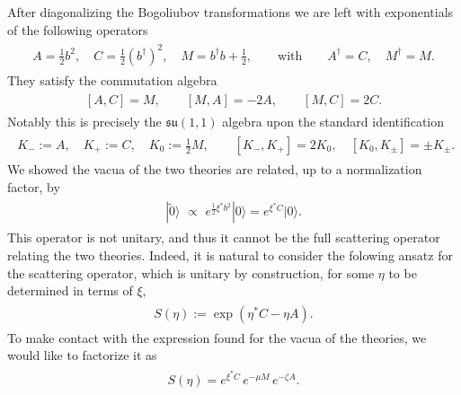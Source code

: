 \documentclass[../QFT_main.tex]{subfiles}
\begin{document}
\begin{mytheorem}
%
After diagonalizing the Bogoliubov transformations we are left with exponentials of the following operators
\begin{align}
\begin{aligned}
    A=\frac12 b^2,\quad C=\frac12 (b^\dagger)^2,\quad M=b^\dagger b+\frac12, \qquad \text{with}\qquad A^\dagger=C,\quad M^\dagger=M.
\end{aligned}\end{align}
They satisfy the commutation algebra
\begin{align}
\begin{aligned}
    [A,C]=M,\qquad [M,A]=-2A,\qquad [M,C]=2C.
\end{aligned}\end{align}
Notably this is precisely the $\mathfrak{su}(1,1)$ algebra upon the standard identification
\begin{align}
\begin{aligned}
    K_-:=A,\quad K_+:=C,\quad K_0:=\frac12 M,
    \qquad [K_-,K_+]=2K_0,\quad [K_0,K_\pm]=\pm K_\pm.
\end{aligned}
\end{align}
We showed the vacua of the two theories are related, up to a normalization factor, by 
\begin{align}
\begin{aligned}
    |\tilde{0}\rangle \,\,\propto\,\, e^{\frac12 \xi^* b^2} |0\rangle = e^{\xi^* C} |0\rangle.
\end{aligned}\end{align}
This operator is not unitary, and thus it cannot be the full scattering operator relating the two theories.
Indeed, it is natural to consider the folowing ansatz for the scattering operator, which is unitary by construction, for some $\eta$ to be determined in terms of $\xi$,
\begin{align}
\begin{aligned}
    S(\eta):=\exp(\eta^*C-\eta A).
\end{aligned}\end{align}
To make contact with the expression found for the vacua of the theories, we would like to factorize it as
\begin{align}
\begin{aligned}
    S(\eta)=e^{\xi^* C}\,e^{-\mu M}\,e^{-\zeta A}.
\end{aligned}\end{align}

\end{mytheorem}
\end{document}
